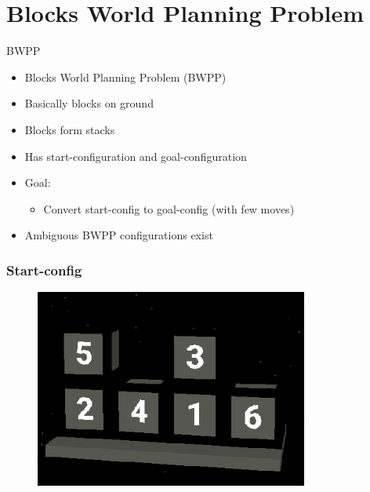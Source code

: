 \documentclass[12pt]{beamer}
\begin{document}
    \section{Blocks World Planning Problem}
        \begin{frame}[fragile]{BWPP}
           \begin{itemize}
               \item Blocks World Planning Problem (BWPP)
               \item Basically blocks on ground
               \item Blocks form stacks
               \item Has start-configuration and goal-configuration
               \item Goal:
               \begin{itemize}
                   \item Convert start-config to goal-config (with few moves)
               \end{itemize}
                \item Ambiguous BWPP configurations exist
           \end{itemize} 
        \end{frame}

        \begin{frame}[fragile]
            \frametitle{Start-config}
            \begin{figure}
                \includegraphics[width=9cm]{start_config.png}
            \end{figure} 
        \end{frame}
        
\end{document}
